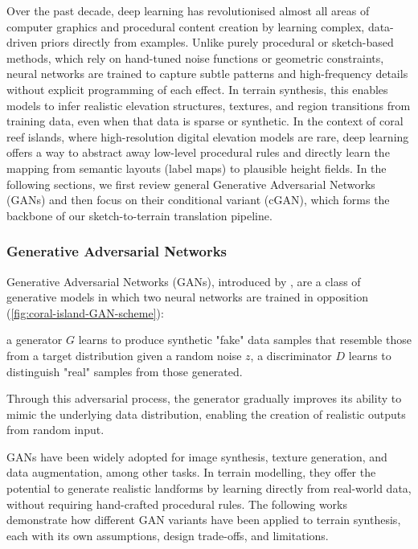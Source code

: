 Over the past decade, deep learning has revolutionised almost all areas of computer graphics and procedural content creation by learning complex, data-driven priors directly from examples. Unlike purely procedural or sketch-based methods, which rely on hand-tuned noise functions or geometric constraints, neural networks are trained to capture subtle patterns and high-frequency details without explicit programming of each effect. In terrain synthesis, this enables models to infer realistic elevation structures, textures, and region transitions from training data, even when that data is sparse or synthetic. In the context of coral reef islands, where high-resolution digital elevation models are rare, deep learning offers a way to abstract away low-level procedural rules and directly learn the mapping from semantic layouts (label maps) to plausible height fields. 
In the following sections, we first review general Generative Adversarial Networks (GANs) and then focus on their conditional variant (cGAN), which forms the backbone of our sketch-to-terrain translation pipeline.

\subsubsection{Generative Adversarial Networks}
\label{sec:coral-island-sota-GAN}

Generative Adversarial Networks (GANs), introduced by \cite{Goodfellow2014}, are a class of generative models in which two neural networks are trained in opposition (\cref{fig:coral-island-GAN-scheme}): 
\begin{Itemize}
    \Item{} a generator $G$ learns to produce synthetic "fake" data samples that resemble those from a target distribution given a random noise $z$, 
    \Item{} a discriminator $D$ learns to distinguish "real" samples from those generated. 
\end{Itemize}

Through this adversarial process, the generator gradually improves its ability to mimic the underlying data distribution, enabling the creation of realistic outputs from random input.

GANs have been widely adopted for image synthesis, texture generation, and data augmentation, among other tasks. In terrain modelling, they offer the potential to generate realistic landforms by learning directly from real-world data, without requiring hand-crafted procedural rules. The following works demonstrate how different GAN variants have been applied to terrain synthesis, each with its own assumptions, design trade-offs, and limitations.

